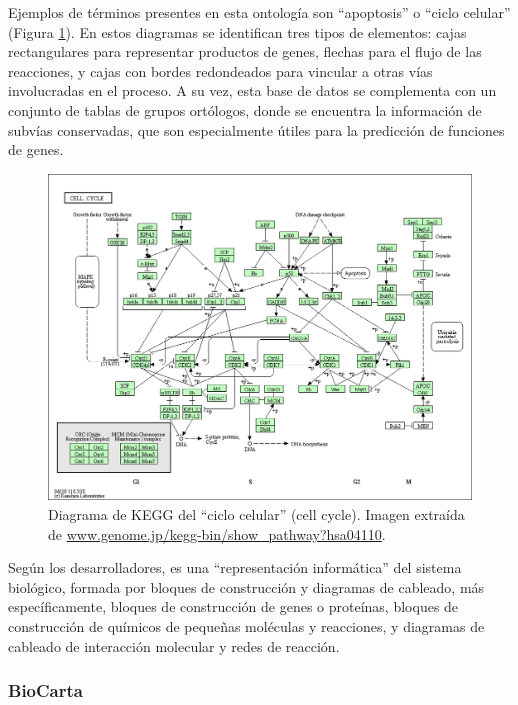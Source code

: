 \documentclass[12pt,twoside]{reedthesis}
\begin{document}
Ejemplos de términos presentes en esta ontología son ``apoptosis'' o ``ciclo celular'' (Figura \ref{fig:keggCellCyclePathw}). En estos diagramas se identifican tres tipos de elementos: cajas rectangulares para representar productos de genes, flechas para el flujo de las reacciones, y cajas con bordes redondeados para vincular a otras vías involucradas en el proceso. A su vez, esta base de datos se complementa con un conjunto de tablas de grupos ortólogos, donde se encuentra la información de subvías conservadas, que son especialmente útiles para la predicción de funciones de genes.
\begin{figure}

{\centering \includegraphics[width=1\linewidth]{images/kegg_cell_cycle_pathway} 

}

\caption{Diagrama de KEGG del ``ciclo celular'' (cell cycle). Imagen extraída de \url{www.genome.jp/kegg-bin/show_pathway?hsa04110}.}\label{fig:keggCellCyclePathw}
\end{figure}


\par

Según los desarrolladores, es una ``representación informática'' del sistema biológico, formada por bloques de construcción y diagramas de cableado, más específicamente, bloques de construcción de genes o proteínas, bloques de construcción de químicos de pequeñas moléculas y reacciones, y diagramas de cableado de interacción molecular y redes de reacción.

\hypertarget{biocarta}{%
\subsubsection{BioCarta}\label{biocarta}}
\end{document}
